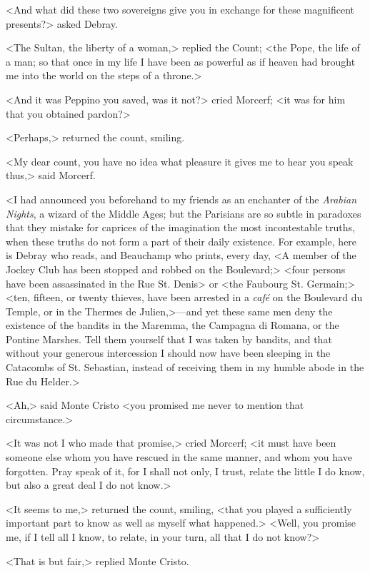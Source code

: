  <And what did these two sovereigns give you in exchange for these magnificent presents?> asked Debray. 

 <The Sultan, the liberty of a woman,> replied the Count; <the Pope, the life of a man; so that once in my life I have been as powerful as if heaven had brought me into the world on the steps of a throne.> 

 <And it was Peppino you saved, was it not?> cried Morcerf; <it was for him that you obtained pardon?> 

 <Perhaps,> returned the count, smiling. 

 <My dear count, you have no idea what pleasure it gives me to hear you speak thus,> said Morcerf. 
 
 <I had announced you beforehand to my friends as an enchanter of the \textit{Arabian Nights}, a wizard of the Middle Ages; but the Parisians are so subtle in paradoxes that they mistake for caprices of the imagination the most incontestable truths, when these truths do not form a part of their daily existence. For example, here is Debray who reads, and Beauchamp who prints, every day, <A member of the Jockey Club has been stopped and robbed on the Boulevard;> <four persons have been assassinated in the Rue St. Denis> or <the Faubourg St. Germain;> <ten, fifteen, or twenty thieves, have been arrested in a \textit{café} on the Boulevard du Temple, or in the Thermes de Julien,>—and yet these same men deny the existence of the bandits in the Maremma, the Campagna di Romana, or the Pontine Marshes. Tell them yourself that I was taken by bandits, and that without your generous intercession I should now have been sleeping in the Catacombs of St. Sebastian, instead of receiving them in my humble abode in the Rue du Helder.> 

 <Ah,> said Monte Cristo <you promised me never to mention that circumstance.> 

 <It was not I who made that promise,> cried Morcerf; <it must have been someone else whom you have rescued in the same manner, and whom you have forgotten. Pray speak of it, for I shall not only, I trust, relate the little I do know, but also a great deal I do not know.> 

 <It seems to me,> returned the count, smiling, <that you played a sufficiently important part to know as well as myself what happened.>  <Well, you promise me, if I tell all I know, to relate, in your turn, all that I do not know?> 

 <That is but fair,> replied Monte Cristo. 


